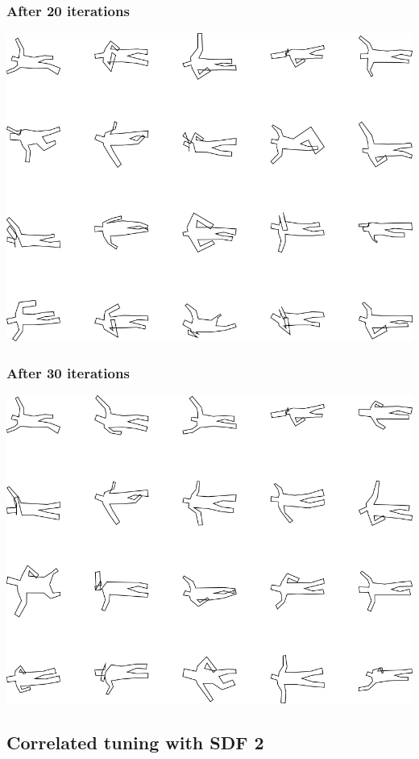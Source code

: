 \subsubsection{After 20 iterations}

\includegraphics[width=6in]{output/3.learning/correlated_tuning/correlated_tuning_iter20_.png}
\subsubsection{After 30 iterations}

\includegraphics[width=6in]{output/3.learning/correlated_tuning/correlated_tuning_iter30_.png}
\subsection{Correlated tuning with SDF 2}

